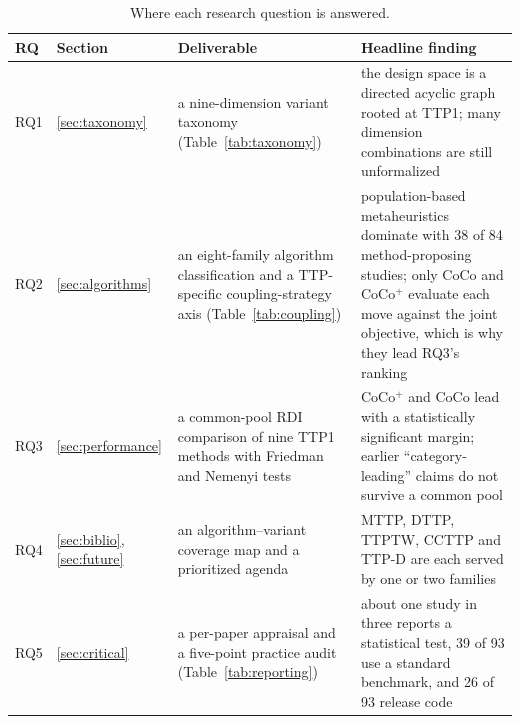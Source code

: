 \begin{table}[htbp]
\centering
\footnotesize
\caption{Where each research question is answered.}
\label{tab:roadmap}
\begin{tabular}{@{}p{0.7cm}p{1.3cm}p{5.5cm}p{7.0cm}@{}}
\toprule
\textbf{RQ} & \textbf{Section} & \textbf{Deliverable} & \textbf{Headline finding} \\
\midrule
RQ1 & \ref{sec:taxonomy} & a nine-dimension variant taxonomy (Table~\ref{tab:taxonomy}) & the design space is a directed acyclic graph rooted at TTP1; many dimension combinations are still unformalized \\
RQ2 & \ref{sec:algorithms} & an eight-family algorithm classification and a TTP-specific coupling-strategy axis (Table~\ref{tab:coupling}) & population-based metaheuristics dominate with 38 of 84 method-proposing studies; only CoCo and CoCo$^+$ evaluate each move against the joint objective, which is why they lead RQ3's ranking \\
RQ3 & \ref{sec:performance} & a common-pool RDI comparison of nine TTP1 methods with Friedman and Nemenyi tests & CoCo$^+$ and CoCo lead with a statistically significant margin; earlier ``category-leading'' claims do not survive a common pool \\
RQ4 & \ref{sec:biblio}, \ref{sec:future} & an algorithm--variant coverage map and a prioritized agenda & MTTP, DTTP, TTPTW, CCTTP and TTP-D are each served by one or two families \\
RQ5 & \ref{sec:critical} & a per-paper appraisal and a five-point practice audit (Table~\ref{tab:reporting}) & about one study in three reports a statistical test, 39 of 93 use a standard benchmark, and 26 of 93 release code \\
\bottomrule
\end{tabular}
\end{table}
